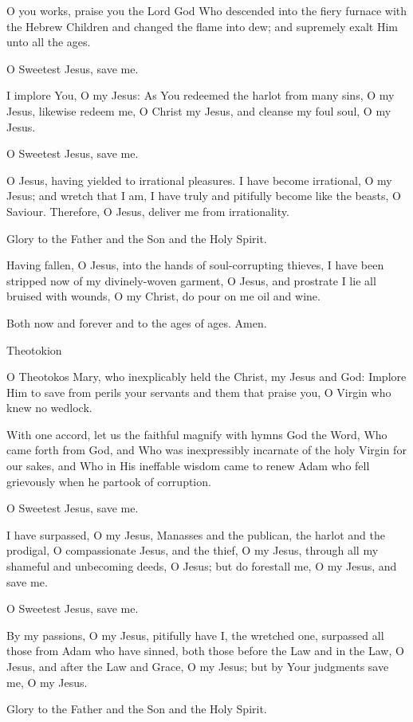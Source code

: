 O you works, praise you the Lord God Who descended into the fiery
furnace with the Hebrew Children and changed the flame into dew; and
supremely exalt Him unto all the ages.

O Sweetest Jesus, save me.

I implore You, O my Jesus: As You redeemed the harlot from many sins, O
my Jesus, likewise redeem me, O Christ my Jesus, and cleanse my foul
soul, O my Jesus.

O Sweetest Jesus, save me.

O Jesus, having yielded to irrational pleasures. I have become
irrational, O my Jesus; and wretch that I am, I have truly and pitifully
become like the beasts, O Saviour. Therefore, O Jesus, deliver me from
irrationality.

Glory to the Father and the Son and the Holy Spirit.

Having fallen, O Jesus, into the hands of soul-corrupting thieves, I
have been stripped now of my divinely-woven garment, O Jesus, and
prostrate I lie all bruised with wounds, O my Christ, do pour on me oil
and wine.

Both now and forever and to the ages of ages. Amen.

Theotokion

O Theotokos Mary, who inexplicably held the Christ, my Jesus and God:
Implore Him to save from perils your servants and them that praise you,
O Virgin who knew no wedlock.

With one accord, let us the faithful magnify with hymns God the Word,
Who came forth from God, and Who was inexpressibly incarnate of the holy
Virgin for our sakes, and Who in His ineffable wisdom came to renew Adam
who fell grievously when he partook of corruption.

O Sweetest Jesus, save me.

I have surpassed, O my Jesus, Manasses and the publican, the harlot and
the prodigal, O compassionate Jesus, and the thief, O my Jesus, through
all my shameful and unbecoming deeds, O Jesus; but do forestall me, O my
Jesus, and save me.

O Sweetest Jesus, save me.

By my passions, O my Jesus, pitifully have I, the wretched one,
surpassed all those from Adam who have sinned, both those before the Law
and in the Law, O Jesus, and after the Law and Grace, O my Jesus; but by
Your judgments save me, O my Jesus.

Glory to the Father and the Son and the Holy Spirit.

